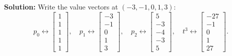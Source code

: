 \documentclass[11pt, letterpaper]{article}
\theoremstyle{definition}
\theoremstyle{remark}
\begin{document}
\textbf{Solution:} Write the value vectors at $(-3, -1, 0, 1, 3)$:
\[
p_0 \leftrightarrow \begin{bmatrix} 1 \\ 1 \\ 1 \\ 1 \\ 1 \end{bmatrix}, \quad
p_1 \leftrightarrow \begin{bmatrix} -3 \\ -1 \\ 0 \\ 1 \\ 3 \end{bmatrix}, \quad
p_2 \leftrightarrow \begin{bmatrix} 5 \\ -3 \\ -4 \\ -3 \\ 5 \end{bmatrix}, \quad
t^3 \leftrightarrow \begin{bmatrix} -27 \\ -1 \\ 0 \\ 1 \\ 27 \end{bmatrix}.
\]
\end{document}
